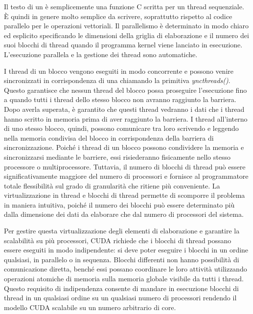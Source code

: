 Il testo di un  è semplicemente una funzione C scritta per un thread sequenziale. È quindi in genere molto semplice da scrivere, soprattutto rispetto al codice parallelo per le operazioni vettoriali. Il parallelismo è determinato in modo chiaro ed esplicito specificando le dimensioni  della griglia di elaborazione e il numero dei suoi blocchi di thread quando il programma kernel viene lanciato in esecuzione. L'esecuzione parallela e la gestione dei thread sono automatiche. 

I thread di un blocco vengono eseguiti in modo concorrente e possono venire sincronizzati in corrispondenza di una  chiamando la primitiva \textit{yncthreads()}. Questo garantisce che nessun thread del blocco possa proseguire l'esecuzione fino a quando tutti i thread dello stesso blocco non avranno raggiunto la barriera. Dopo averla superata, è garantito che questi thread vedranno i dati che i thread hanno scritto in memoria prima di aver raggiunto la barriera. I thread all'interno di uno stesso blocco, quindi, possono comunicare tra loro scrivendo e leggendo nella memoria condivisa del blocco in corrispondenza della barriera di sincronizzazione. Poiché i thread di un blocco possono condividere la memoria e sincronizzarsi mediante le barriere, essi risiederanno fisicamente nello stesso processore o multiprocessore. Tuttavia, il numero di blocchi di thread può essere significativamente maggiore del numero di processori e fornisce al programmatore totale flessibilità sul grado di granularità che ritiene più conveniente. La virtualizzazione in thread e blocchi di thread permette di scomporre il problema in maniera intuitiva, poiché il numero dei blocchi può essere determinato più dalla dimensione dei dati da elaborare che dal numero di processori del sistema.

Per gestire questa virtualizzazione degli elementi di elaborazione e garantire la scalabilità su più processori, CUDA richiede che i blocchi di thread possano essere eseguiti in modo indipendente: si deve poter eseguire i blocchi in un ordine qualsiasi, in parallelo o in sequenza. Blocchi differenti non hanno possibilità di comunicazione diretta, benché essi possano coordinare le loro attività utilizzando operazioni atomiche di memoria sulla memoria globale visibile da tutti i thread. Questo requisito di indipendenza consente di mandare in esecuzione blocchi di thread in un qualsiasi ordine su un qualsiasi numero di processori rendendo il modello CUDA scalabile su un numero arbitrario di core.

